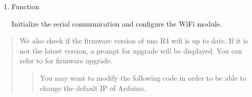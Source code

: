\documentclass[a4paper,11pt,english]{sphinxmanual}
\begin{document}
\begin{enumerate}
\item {} 
\sphinxAtStartPar
{} Function

\sphinxAtStartPar
Initialize the serial communication and configure the WiFi module.

\begin{sphinxVerbatim}[commandchars=\\\{\}]

\end{sphinxVerbatim}

\end{enumerate}
\begin{quote}

\sphinxAtStartPar
We also check if the firmware version of uno R4 wifi is up to date. If it is not the latest version, a prompt for upgrade will be displayed. You can refer to  for firmware upgrade.
\begin{quote}

\begin{sphinxVerbatim}[commandchars=\\\{\}]
\end{sphinxVerbatim}

\sphinxAtStartPar
You may want to modify the following code in order to be able to change the default IP of Arduino.

\begin{sphinxVerbatim}[commandchars=\\\{\}]
\end{sphinxVerbatim}
\end{quote}
\end{quote}
\end{document}
